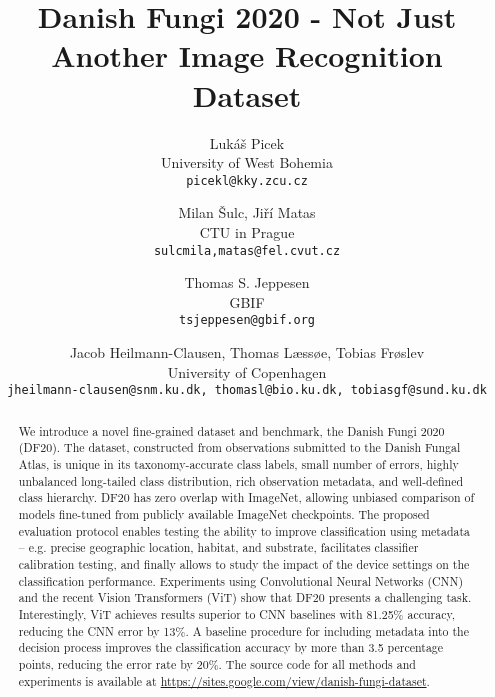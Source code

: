 \documentclass[10pt,twocolumn,letterpaper]{article}
\begin{document}
\title{Danish Fungi 2020 - Not Just Another Image Recognition Dataset}


\author{
Luk\'{a}\v{s} Picek \\ University of West Bohemia \\ {\tt\small picekl@kky.zcu.cz} 
\and Milan \v{S}ulc, Ji\v{r}\'{i} Matas \\ CTU in Prague \\ {\tt\small {{sulcmila,matas}@fel.cvut.cz}}
\and Thomas S. Jeppesen \\ GBIF \\ {\tt\small tsjeppesen@gbif.org}
\and Jacob Heilmann-Clausen, Thomas Læssøe, Tobias Frøslev \\ University of Copenhagen \\ {\tt\small jheilmann-clausen@snm.ku.dk, thomasl@bio.ku.dk, tobiasgf@sund.ku.dk}





}







\maketitle
\ificcvfinal\thispagestyle{empty}\fi

\begin{abstract}

We introduce a novel fine-grained dataset and benchmark, the Danish Fungi 2020 (DF20). The dataset, constructed from observations submitted to the Danish Fungal Atlas, is unique in its taxonomy-accurate class labels, small number of errors, highly unbalanced long-tailed class distribution, rich observation metadata, and well-defined class hierarchy. DF20 has zero overlap with ImageNet, allowing unbiased comparison of models fine-tuned from publicly available ImageNet checkpoints. The proposed evaluation protocol enables testing the ability to improve classification using metadata -- e.g. precise geographic location, habitat, and substrate, facilitates classifier calibration testing, and finally allows to study the impact of the device settings on the classification performance. 
Experiments using Convolutional Neural Networks (CNN) and the recent Vision Transformers (ViT) show that DF20 presents a challenging task. Interestingly, ViT achieves results superior to CNN baselines with 81.25\% accuracy, reducing the CNN error by 13\%. A baseline procedure for including metadata into the decision process improves the classification accuracy by more than 3.5 percentage points, reducing the error rate by 20\%. The source code for all methods and experiments is available at \url{https://sites.google.com/view/danish-fungi-dataset}.

\end{abstract}
\end{document}
